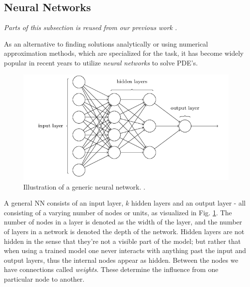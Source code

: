 \subsection{Neural Networks} \label{sec:NN}
\textit{Parts of this subsection is reused from our previous work \citep[p. 7-10]{project2}.}

As an alternative to finding solutions analytically or using numerical approximation methods, which are specialized for the task, it has become widely popular in recent years to utilize \textit{neural networks} to solve PDE's.


\begin{figure}[H]
    \centering
    \includegraphics[width=1\linewidth]{project_2/figures/generic_NN.png}
    \caption{Illustration of a generic neural network. \cite[Taken from][Ch.1]{nielsen}.}
    \label{fig:NN}
\end{figure}

A general NN consists of an input layer, $k$ hidden layers and an output layer - all consisting of a varying number of nodes or units, as visualized in Fig. \ref{fig:NN}. The number of nodes in a layer is denoted as the width of the layer, and the number of layers in a network is denoted the depth of the network. 
Hidden layers are not hidden in the sense that they're not a visible part of the model; but rather that when using a trained model one never interacts with anything past the input and output layers, thus the internal nodes appear as hidden. 
Between the nodes we have connections called \textit{weights}. These determine the influence from one particular node to another. 

